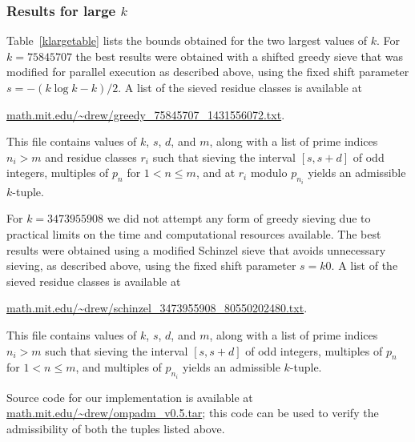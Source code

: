 \documentclass{bmcart}
\theoremstyle{plain}
\theoremstyle{definition}
\begin{document}
\subsubsection{Results for large \texorpdfstring{$k$}{k}}

Table~\ref{klargetable} lists the bounds obtained for the two largest values of $k$.
For $k=\num{75845707}$ the best results were obtained with a shifted greedy sieve that was modified for parallel execution as described above, using the fixed shift parameter $s=-(k\log k-k)/2$.
A list of the sieved residue classes is available at
\begin{center}
 \url{math.mit.edu/~drew/greedy_75845707_1431556072.txt}.
\end{center}
This file contains values of $k$, $s$, $d$, and $m$, along with a list of prime indices $n_i> m$ and residue classes $r_i$ such that sieving the interval $[s,s+d]$ of odd integers, multiples of $p_n$ for $1<n \le m$, and at $r_i$ modulo $p_{n_i}$ yields an admissible $k$-tuple.

For $k=\num{3473955908}$ we did not attempt any form of greedy sieving due to practical limits on the time and computational resources available. The best results were obtained using a modified Schinzel sieve that avoids unnecessary sieving, as described above, using the fixed shift parameter $s=k0$.
A list of the sieved residue classes is available at
\begin{center}
 \url{math.mit.edu/~drew/schinzel_3473955908_80550202480.txt}.
\end{center}
This file contains values of $k$, $s$, $d$, and $m$, along with a list of prime indices $n_i> m$ such that sieving the interval $[s,s+d]$ of odd integers, multiples of $p_n$ for $1<n \le m$, and multiples of $p_{n_i}$ yields an admissible $k$-tuple.

Source code for our implementation is available at \url{math.mit.edu/~drew/ompadm_v0.5.tar}; this code can be used to verify the admissibility of both the tuples listed above.
\end{document}
